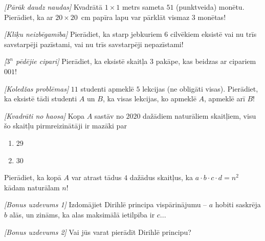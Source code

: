 \begin{problem}
\textit{[Pārāk daudz naudas]}
Kvadrātā $1\times 1$ metrs sameta $51$ (punktveida) monētu. Pierādiet, ka ar \mbox{$20\times 20$ cm} papīra lapu var pārklāt vismaz $3$ monētas!

\end{problem}

\begin{problem}
\textit{[Kliķu neizbēgamība]}
Pierādiet, ka starp jebkuriem  $6$ cilvēkiem eksistē vai nu trīs savstarpēji pazīstami, vai nu trīs savstarpēji nepazīstami!
\end{problem}

\begin{problem}
\textit{[$3^n$ pēdējie cipari]}
Pierādiet, ka eksistē skaitļa 3 pakāpe, kas beidzas ar cipariem $001$!
\end{problem}

\begin{problem}
\textit{[Koledžas problēmas]}
$11$ studenti apmeklē $5$ lekcijas (ne obligāti visas). Pierādiet, ka eksistē tādi studenti $A$ un $B$, ka visas lekcijas, ko apmeklē $A$, apmeklē arī $B$!
\end{problem}

\begin{problem}
\textit{[Kvadrāti no haosa]}
Kopa $A$ sastāv no $2020$ dažādiem naturāliem skaitļiem, visu šo skaitļu pirmreizinātāji ir mazāki par 
\renewcommand{\labelenumi}{\alph{enumi})}
\begin{enumerate}
\item
29
\item
30
\end{enumerate}
Pierādiet, ka kopā $A$ var atrast tādus $4$ dažādus skaitļus, ka $a\cdot b \cdot c \cdot d = n^2$ kādam naturālam $n$!
\end{problem}

\begin{problem}
\textit{[Bonus uzdevums 1]}
Izdomājiet Dirihlē principa vispārinājumu – $a$ hobiti saskrēja $b$ alās, un zināms, ka alas maksimālā ietilpība ir $c$...
\end{problem}

\begin{problem}
\textit{[Bonus uzdevums 2]}
Vai jūs varat pierādīt Dirihlē principu?
\end{problem}


